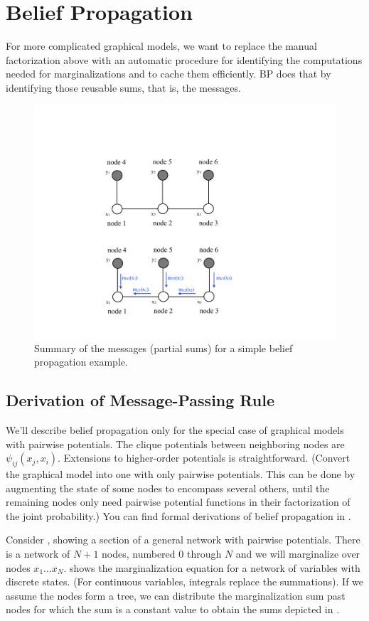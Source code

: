 \section{Belief Propagation}

For more complicated graphical models, we want to 
replace the manual factorization above
with an automatic procedure for identifying the
computations needed for marginalizations and to 
cache them efficiently.  BP does that by
identifying those reusable sums, that is, the messages. 

\begin{figure}
\centerline{\includegraphics[width=0.5\linewidth]{figures/graphical_models/3bpc2.pdf}} 
\caption{Summary of the messages (partial sums) for a simple belief propagation example.} 
\label{fig:3bpc}
\end{figure}

\subsection{Derivation of Message-Passing Rule}
\label{sect:bpRules}

We'll describe belief propagation only for the special case of
graphical models with pairwise potentials.  
The clique potentials between neighboring nodes are $\psi_{ij}(x_j, x_i)$.
Extensions to higher-order
potentials is straightforward.  (Convert the
graphical model into one with only pairwise potentials.  This can be
done by augmenting the state of some nodes to encompass several others,
until the remaining nodes only need pairwise potential functions in
their factorization of the joint probability.)  You can find formal
derivations of belief propagation in \cite{Jordan98,Koller2009}.

Consider \fig{\ref{fig:bpmotivator2}}, showing a section of a general network with pairwise potentials.  There is a network of $N+1$
nodes, numbered $0$ through $N$ and we will marginalize over nodes
$x_1 \ldots x_N$.   shows the
marginalization equation for a network of variables with discrete states. (For continuous variables, integrals replace the summations). If we assume the nodes form a tree, we can
distribute the marginalization sum
past nodes for which the sum is a constant value to obtain the sums
depicted in .  

